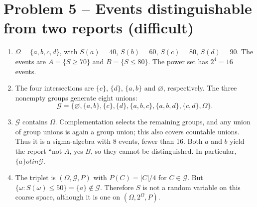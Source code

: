 \documentclass[11pt,a4paper]{article}
\begin{document}
\section*{Problem 5 -- Events distinguishable from two reports (difficult)}
\begin{enumerate}
\item $\Omega=\{a,b,c,d\}$, with $S(a)=40$, $S(b)=60$, $S(c)=80$, $S(d)=90$. The events are $A=\{S\ge70\}$ and $B=\{S\le80\}$. The power set has $2^4=16$ events.
\item The four intersections are $\{c\}$, $\{d\}$, $\{a,b\}$ and $\varnothing$, respectively. The three nonempty groups generate eight unions: \[\mathcal G=\{\varnothing,\{a,b\},\{c\},\{d\},\{a,b,c\},\{a,b,d\},\{c,d\},\Omega\}.\]
\item $\mathcal G$ contains $\Omega$. Complementation selects the remaining groups, and any union of group unions is again a group union; this also covers countable unions. Thus it is a sigma-algebra with 8 events, fewer than 16. Both $a$ and $b$ yield the report ``not $A$, yes $B$, so they cannot be distinguished. In particular, $\{a\}
otin\mathcal G$.
\item The triplet is $(\Omega,\mathcal G,P)$ with $P(C)=|C|/4$ for $C\in\mathcal G$. But $\{\omega:S(\omega)\le50\}=\{a\}\notin\mathcal G$. Therefore $S$ is not a random variable on this coarse space, although it is one on $(\Omega,2^\Omega,P)$.
\end{enumerate}
\end{document}
